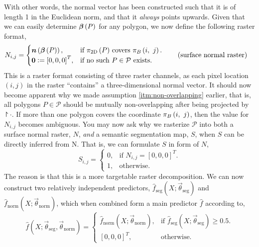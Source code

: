 With other words, the normal vector has been constructed such that it is of length 1 in the Euclidean norm, and that it \emph{always} points upwards.
\noindent
Given that we can easily determine $\boldsymbol{\beta}\left(P\right)$ for any polygon, we now define the following raster format,
\begin{align*}
  N_{i,j} &= \begin{cases}
    \normalplanar{P}, &\text{if $\project{P}$ covers } \pixtogeo{i}{j}.\\
    \vec{0} \defeq {[0, 0, 0]}^T, &\text{if no such } P \in \mathcal{P} \text{ exists.}
  \end{cases}
  \tag{surface normal raster}%
  \label{eq:surface-normal-raster}
\end{align*}
This is a raster format consisting of three raster channels, as each pixel location $(i, j)$ in the raster \enquote{contains} a three-dimensional normal vector.
It should now become apparent why we made assumption \ref{itm:non-overlapping} earlier, that is, all polygons $P \in \mathcal{P}$ should be mutually non-overlapping after being projected by $\project{\cdot}$.
If more than one polygon covers the coordinate $\pi_{B}\left(i,~j\right)$, then the value for $N_{i,j}$ becomes ambiguous.
You may now ask why we rasterize $\mathcal{P}$ into both a surface normal raster, $N$, \emph{and} a semantic segmentation map, $S$, when $S$ can be directly inferred from N.
That is, we can formulate $S$ in form of $N$,
\begin{equation*}
  S_{i, j}
  =
  \begin{cases}
    0, &\text{if } N_{i,j} = {\left[0, 0, 0\right]}^T.  \\
    1, &\text{otherwise.}
  \end{cases}
\end{equation*}
The reason is that this is a more targetable raster decomposition.
We can now construct two relatively independent predictors, $\hat{f}_{\mathrm{seg}}(X; \vec{\theta}_{\mathrm{seg}})$ and $\hat{f}_{\mathrm{norm}}(X; \vec{\theta}_{\mathrm{norm}})$, which when combined form a main predictor $\hat{f}$ according to,
\begin{equation*}
  \hat{f}\left(X; \vec{\theta}_{\mathrm{seg}}, \vec{\theta}_{\mathrm{norm}}\right)
  =
  \begin{cases}
    \hat{f}_{\mathrm{norm}}\left(X; \vec{\theta}_{\mathrm{norm}}\right), &\text{if } \hat{f}_{\mathrm{seg}}\left(X; \vec{\theta}_{\mathrm{seg}}\right) \geq 0.5. \\
    {\left[0, 0, 0\right]}^T, &\text{otherwise.}
  \end{cases}
\end{equation*}
